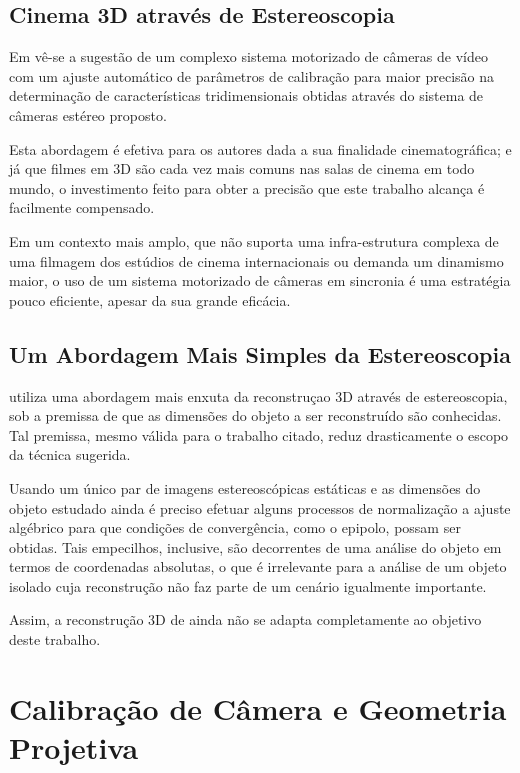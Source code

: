 		\subsection{Cinema 3D através de Estereoscopia}
		
		Em \cite{disneyRelatedWork} vê-se a sugestão de um complexo sistema motorizado de câmeras de vídeo com um ajuste automático de parâmetros de calibração para maior precisão na determinação de características tridimensionais obtidas através do sistema de câmeras estéreo proposto.
		
		Esta abordagem é efetiva para os autores dada a sua finalidade cinematográfica; e já que filmes em 3D são cada vez mais comuns nas salas de cinema em todo mundo, o investimento feito para obter a precisão que este trabalho alcança é facilmente compensado.
		
		Em um contexto mais amplo, que não suporta uma infra-estrutura complexa de uma filmagem dos estúdios de cinema internacionais ou demanda um dinamismo maior, o uso de um sistema motorizado de câmeras em sincronia é uma estratégia pouco eficiente, apesar da sua grande eficácia.
		
		\subsection{Um Abordagem Mais Simples da Estereoscopia}
		
		\cite{stereoRelatedWork} utiliza uma abordagem mais enxuta da reconstruçao 3D através de estereoscopia, sob a premissa de que as dimensões do objeto a ser reconstruído são conhecidas. Tal premissa, mesmo válida para o trabalho citado, reduz drasticamente o escopo da técnica sugerida.
		
		Usando um único par de imagens estereoscópicas estáticas e as dimensões do objeto estudado ainda é preciso efetuar alguns processos de normalização a ajuste algébrico para que condições de convergência, como o epipolo, possam ser obtidas. Tais empecilhos, inclusive, são decorrentes de uma análise do objeto em termos de coordenadas absolutas, o que é irrelevante para a análise de um objeto isolado cuja reconstrução não faz parte de um cenário igualmente importante.
		
		Assim, a reconstrução 3D de \cite{stereoRelatedWork} ainda não se adapta completamente ao objetivo deste trabalho.
		
	\section{Calibração de Câmera e Geometria Projetiva}
		\label{secaoEstadoDaArteCalibracao}
	
